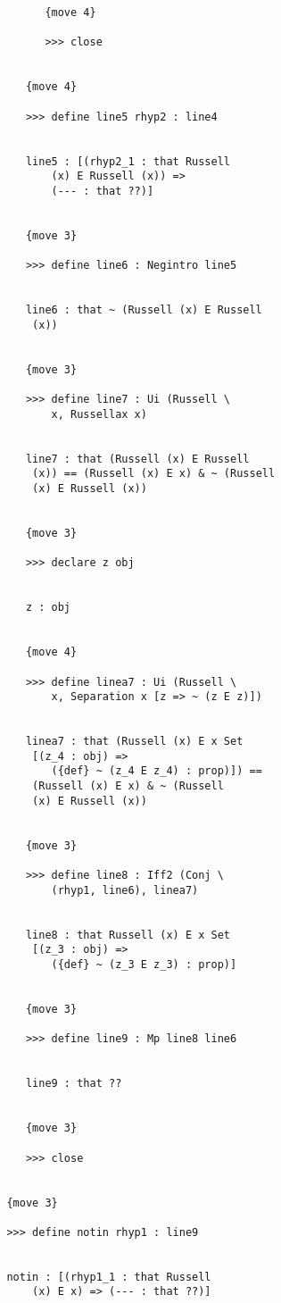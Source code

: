 \documentclass[12pt]{article}
\begin{document}
\begin{verbatim}
               {move 4}

               >>> close


            {move 4}

            >>> define line5 rhyp2 : line4


            line5 : [(rhyp2_1 : that Russell 
                (x) E Russell (x)) => 
                (--- : that ??)]


            {move 3}

            >>> define line6 : Negintro line5


            line6 : that ~ (Russell (x) E Russell 
             (x))


            {move 3}

            >>> define line7 : Ui (Russell \
                x, Russellax x)


            line7 : that (Russell (x) E Russell 
             (x)) == (Russell (x) E x) & ~ (Russell 
             (x) E Russell (x))


            {move 3}

            >>> declare z obj


            z : obj


            {move 4}

            >>> define linea7 : Ui (Russell \
                x, Separation x [z => ~ (z E z)])


            linea7 : that (Russell (x) E x Set 
             [(z_4 : obj) => 
                ({def} ~ (z_4 E z_4) : prop)]) == 
             (Russell (x) E x) & ~ (Russell 
             (x) E Russell (x))


            {move 3}

            >>> define line8 : Iff2 (Conj \
                (rhyp1, line6), linea7)


            line8 : that Russell (x) E x Set 
             [(z_3 : obj) => 
                ({def} ~ (z_3 E z_3) : prop)]


            {move 3}

            >>> define line9 : Mp line8 line6


            line9 : that ??


            {move 3}

            >>> close


         {move 3}

         >>> define notin rhyp1 : line9


         notin : [(rhyp1_1 : that Russell 
             (x) E x) => (--- : that ??)]



\end{verbatim}
\end{document}
